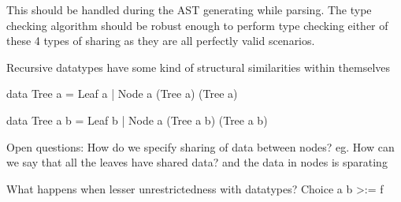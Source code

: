 This should be handled during the AST generating while parsing.
The type checking algorithm should be robust enough
to perform type checking either of these 4 types of sharing as they are
all perfectly valid scenarios.

Recursive datatypes have some kind of structural similarities within themselves

data Tree a = Leaf a | Node a (Tree a) (Tree a)

data Tree a b = Leaf b | Node a (Tree a b) (Tree a b)

Open questions:
How do we specify sharing of data between nodes?
eg. How can we say that all the leaves have shared data? and the data in nodes is sparating


What happens when lesser unrestrictedness with datatypes? Choice a b >:= f


